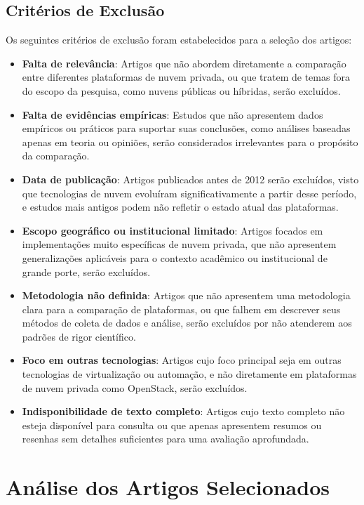 \subsection{Critérios de Exclusão}

Os seguintes critérios de exclusão foram estabelecidos para a seleção dos artigos:

\begin{itemize}
    \item \textbf{Falta de relevância}: Artigos que não abordem diretamente a comparação entre diferentes plataformas de nuvem privada, ou que tratem de temas fora do escopo da pesquisa, como nuvens públicas ou híbridas, serão excluídos.
    \item \textbf{Falta de evidências empíricas}: Estudos que não apresentem dados empíricos ou práticos para suportar suas conclusões, como análises baseadas apenas em teoria ou opiniões, serão considerados irrelevantes para o propósito da comparação.
    \item \textbf{Data de publicação}: Artigos publicados antes de 2012 serão excluídos, visto que tecnologias de nuvem evoluíram significativamente a partir desse período, e estudos mais antigos podem não refletir o estado atual das plataformas.
    \item \textbf{Escopo geográfico ou institucional limitado}: Artigos focados em implementações muito específicas de nuvem privada, que não apresentem generalizações aplicáveis para o contexto acadêmico ou institucional de grande porte, serão excluídos.
    \item \textbf{Metodologia não definida}: Artigos que não apresentem uma metodologia clara para a comparação de plataformas, ou que falhem em descrever seus métodos de coleta de dados e análise, serão excluídos por não atenderem aos padrões de rigor científico.
    \item \textbf{Foco em outras tecnologias}: Artigos cujo foco principal seja em outras tecnologias de virtualização ou automação, e não diretamente em plataformas de nuvem privada como OpenStack, serão excluídos.
    \item \textbf{Indisponibilidade de texto completo}: Artigos cujo texto completo não esteja disponível para consulta ou que apenas apresentem resumos ou resenhas sem detalhes suficientes para uma avaliação aprofundada.
\end{itemize}

\section{Análise dos Artigos Selecionados}

